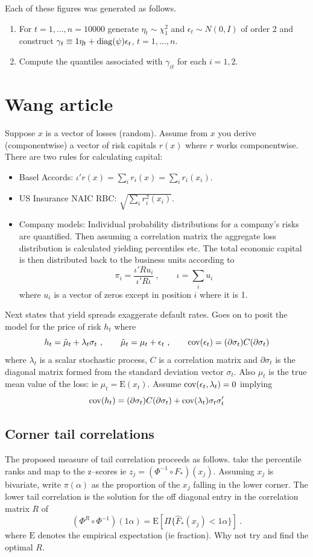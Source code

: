 \documentclass[a4paper,12pt]{article}
\newcommand{\eps}{\epsilon}
\newcommand{\cov}{{\rm cov}}
\newcommand{\diag}{{\rm diag}}
\newcommand{\E}{{\mathrm E}}
\begin{document}
   Each of these figures was generated as follows.
\begin{enumerate}
  \item For $t=1,\ldots,n=10000$ generate $\eta_t\sim\chi^2_1$ and $\eps_t\sim N(0,I)$ of order 2 and construct $\gamma_t\equiv 1\eta_t+\diag(\psi)\eps_t$, $t=1,\ldots,n$.
  \item Compute the quantiles associated with $\gamma_{it}$ for each $i=1,2$.
\end{enumerate}

\section{Wang article}

Suppose $x$ is a vector of losses (random).  Assume from $x$ you derive (componentwise) a vector of risk capitals $r(x)$ where $r$ works componentwise.   There are two rules for calculating capital:
\begin{itemize}
  \item Basel Accords: $\iota'r(x) = \sum_ir_i(x) =\sum_ir_i(x_i)$.
  \item US Insurance NAIC RBC: $\sqrt{\sum_ir_i^2(x_i)}$.
  \item Company models:  Individual probability distributions for a company's risks are quantified.  Then assuming a correlation matrix the aggregate loss distribution is calculated yielding percentiles etc.   The total economic capital is then distributed back to the business units according to
      $$
      \pi_i = \frac{\iota'R u_i}{\iota'R\iota}\ , \qquad \iota = \sum_i u_i
      $$
      where $u_i$ is a vector of zeros except in position  $i$ where it is 1.
\end{itemize}

Next states that yield spreads exaggerate default rates.  Goes on to posit the model for the price of risk $h_t$ where
$$
h_t = \hat\mu_t + \lambda_t\sigma_t\ ,\qquad \hat \mu_t = \mu_t + \eps_t\ , \qquad \cov(\eps_t) = (\partial\sigma_t) C(\partial\sigma_t)
$$
where $\lambda_t$ is a scalar stochastic process, $C$ is a correlation matrix and $\partial \sigma_t$ is the diagonal matrix formed from the standard deviation vector $\sigma_t$. Also $\mu_t$ is the true mean value of the loss: ie $\mu_t=\E(x_t)$.  Assume $\cov(\eps_t,\lambda_t)=0$ implying
$$
\cov(h_t) = (\partial\sigma_t) C(\partial\sigma_t) + \cov(\lambda_t)\sigma_t\sigma_t'
$$
\subsection{Corner tail correlations}
The proposed measure of tail correlation proceeds as follows.   take the percentile ranks and map to the z--scores ie $z_j=(\Phi^{-1}\circ F_*)(x_j)$.  Assuming $x_j$ is bivariate, write $\pi(\alpha)$ as the proportion of the $x_j$ falling in the lower corner.  The lower tail correlation is the solution for the off diagonal entry in the correlation matrix $R$ of
$$
(\Phi^R\circ\Phi^{-1})(1\alpha) =\E[\Pi \{\hat F_*(x_j)<1\alpha\}]\ .
$$
where $\E$ denotes the empirical expectation (ie fraction).  Why not try and find the optimal $R$.
\end{document}
